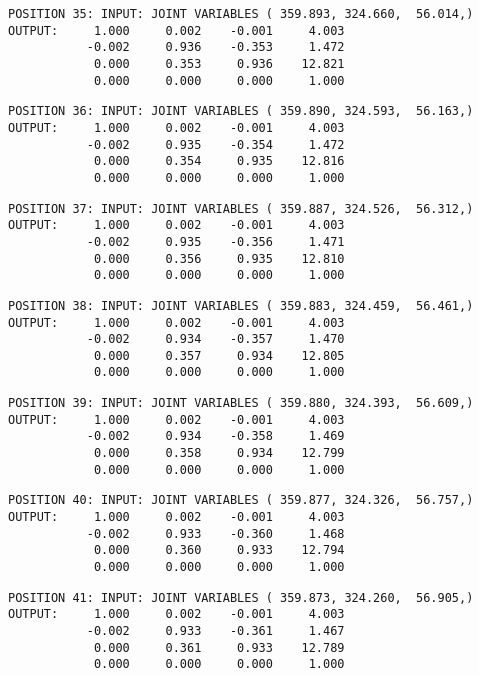 \begin{verbatim}
POSITION 35: INPUT: JOINT VARIABLES ( 359.893, 324.660,  56.014,)
OUTPUT:     1.000     0.002    -0.001     4.003
           -0.002     0.936    -0.353     1.472
            0.000     0.353     0.936    12.821
            0.000     0.000     0.000     1.000
\end{verbatim} \pagebreak[1]\begin{verbatim}
POSITION 36: INPUT: JOINT VARIABLES ( 359.890, 324.593,  56.163,)
OUTPUT:     1.000     0.002    -0.001     4.003
           -0.002     0.935    -0.354     1.472
            0.000     0.354     0.935    12.816
            0.000     0.000     0.000     1.000
\end{verbatim} \pagebreak[1]\begin{verbatim}
POSITION 37: INPUT: JOINT VARIABLES ( 359.887, 324.526,  56.312,)
OUTPUT:     1.000     0.002    -0.001     4.003
           -0.002     0.935    -0.356     1.471
            0.000     0.356     0.935    12.810
            0.000     0.000     0.000     1.000
\end{verbatim} \pagebreak[1]\begin{verbatim}
POSITION 38: INPUT: JOINT VARIABLES ( 359.883, 324.459,  56.461,)
OUTPUT:     1.000     0.002    -0.001     4.003
           -0.002     0.934    -0.357     1.470
            0.000     0.357     0.934    12.805
            0.000     0.000     0.000     1.000
\end{verbatim} \pagebreak[1]\begin{verbatim}
POSITION 39: INPUT: JOINT VARIABLES ( 359.880, 324.393,  56.609,)
OUTPUT:     1.000     0.002    -0.001     4.003
           -0.002     0.934    -0.358     1.469
            0.000     0.358     0.934    12.799
            0.000     0.000     0.000     1.000
\end{verbatim} \pagebreak[1]\begin{verbatim}
POSITION 40: INPUT: JOINT VARIABLES ( 359.877, 324.326,  56.757,)
OUTPUT:     1.000     0.002    -0.001     4.003
           -0.002     0.933    -0.360     1.468
            0.000     0.360     0.933    12.794
            0.000     0.000     0.000     1.000
\end{verbatim} \pagebreak[1]\begin{verbatim}
POSITION 41: INPUT: JOINT VARIABLES ( 359.873, 324.260,  56.905,)
OUTPUT:     1.000     0.002    -0.001     4.003
           -0.002     0.933    -0.361     1.467
            0.000     0.361     0.933    12.789
            0.000     0.000     0.000     1.000
\end{verbatim} \pagebreak[1]\begin{verbatim}

\end{verbatim}
